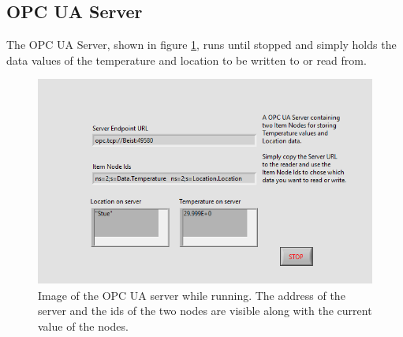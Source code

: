 \documentclass[11pt, A4paper, english]{article}
\numberwithin{equation}{section}
\begin{document}
\begin{multicols}{2}
		\subsection{OPC UA Server}
The OPC UA Server, shown in figure \ref{fig:opc-server}, runs until stopped and simply holds the data values of the temperature and location to be written to or read from.
			\begin{figure}[H]
\includegraphics[width=\columnwidth]{OPC Server.png}
\caption{Image of the OPC UA server while running. The address of the server and the ids of the two nodes are visible along with the current value of the nodes.}
\label{fig:opc-server}
			\end{figure}
		

\end{multicols}
\end{document}
